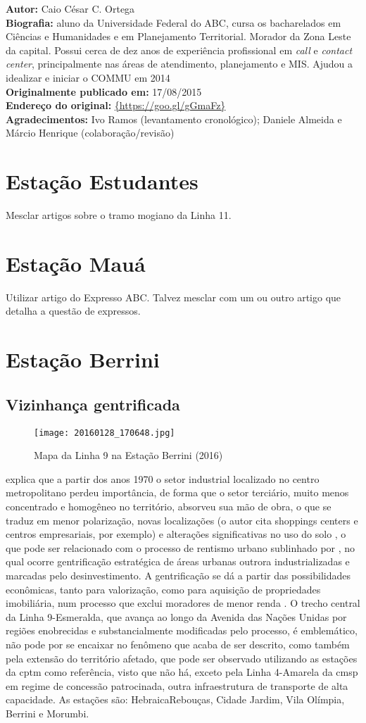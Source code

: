 \documentclass[11pt,fleqn]{book} %
\newcommand{\infocaio}[2]{\textbf{Autor:} Caio C\'{e}sar C. Ortega \\ \textbf{Biografia:} aluno da Universidade Federal do ABC, cursa os bacharelados em Ci\^{e}ncias e Humanidades e em Planejamento Territorial. Morador da Zona Leste da capital. Possui cerca de dez anos de experi\^{e}ncia profissional em \textit{call} e \textit{contact center}, principalmente nas \'{a}reas de atendimento, planejamento e MIS. Ajudou a idealizar e iniciar o COMMU em 2014 \\ \textbf{Originalmente publicado em:} {#1} \\ \textbf{Endere\c{c}o do original:} \url{{#2}}}
\begin{document}
\begin{info}
	\infocaio{17/08/2015}{https://goo.gl/gGmaFz}\\
	\textbf{Agradecimentos:} Ivo Ramos (levantamento cronológico); Daniele Almeida e Márcio Henrique (colaboração/revisão)
\end{info}

\section{Estação Estudantes}

Mesclar artigos sobre o tramo mogiano da Linha 11.

\section{Estação Mauá}

Utilizar artigo do Expresso ABC. Talvez mesclar com um ou outro artigo que detalha a questão de expressos.

\section{Estação Berrini}\label{s:brr}

\subsection{Vizinhança gentrificada}

\begin{wrapfigure}{l}{0.25\textwidth}
	\caption{Mapa da Linha 9 na Estação Berrini (2016)}
	\texttt{[image: 20160128\_170648.jpg]}
\end{wrapfigure}

\cite[p. 13]{Ferreira} explica que a partir dos anos 1970 o setor industrial localizado no centro metropolitano perdeu importância, de forma que o setor terciário, muito menos concentrado e homogêneo no território, absorveu sua mão de obra, o que se traduz em menor polarização, novas localizações (o autor cita shoppings centers e centros empresariais, por exemplo) e alterações significativas no uso do solo \cite[p. 25]{Ferreira}, o que pode ser relacionado com o processo de rentismo urbano sublinhado por \cite[pág 30, nota de rodapé 2]{Acselrad}, no qual ocorre gentrificação estratégica de áreas urbanas outrora industrializadas e marcadas pelo desinvestimento. A gentrificação se dá a partir das possibilidades econômicas, tanto para valorização, como para aquisição de propriedades imobiliária, num processo que exclui moradores de menor renda \cite[p. 28-29]{Acselrad}. O trecho central da Linha 9-Esmeralda, que avança ao longo da Avenida das Nações Unidas por regiões enobrecidas e substancialmente modificadas pelo processo, é emblemático, não pode por se encaixar no fenômeno que acaba de ser descrito, como também pela extensão do território afetado, que pode ser observado utilizando as estações da \gls{cptm} como referência, visto que não há, exceto pela Linha 4-Amarela da \gls{cmsp} em regime de concessão patrocinada, outra infraestrutura de transporte de alta capacidade. As estações são: Hebraica\textperiodcentered Rebouças, Cidade Jardim, Vila Olímpia, Berrini e Morumbi.
\end{document}
